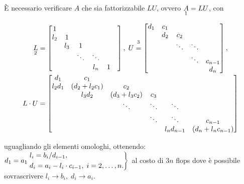 \noindent È necessario verificare $A$ che sia fattorizzabile $LU$, ovvero $\underset{\footnotemark}{A}=LU$, con
\begin{equation*}
    \begin{matrix}
        \underset{\footnotemark}{L}=
    \begin{bmatrix}
        1 & & & &\\
        l_2 & 1 & & &\\
        & l_3 & 1 & &\\
        & & \ddots & \ddots & &\\
        & & & l_n & 1
    \end{bmatrix}
    ,\; U\overset{\footnotemark}{=}
    \begin{bmatrix}
        d_1 & c_1 &\\
            & d_2 & c_2\\
            & & \ddots & \ddots\\
            & & & \ddots & c_{n-1}\\
            & & & & d_n
    \end{bmatrix},\\
    L\cdot U=
    \begin{bmatrix}
        d_1 & c_1 & & & &\\
        l_2d_1 & (d_2+l_2 c_1) & c_2 & & &\\
            & l_3d_2 & (d_3+l_3c_2) & c_3 & &\\
            & & \ddots &\ddots & \ddots &\\
            & & & \ddots & \ddots & c_{n-1}\\
            & & & &  l_nd_{n-1} & (d_n+l_nc_{n-1})
    \end{bmatrix}
    \end{matrix}
\end{equation*}
\addtocounter{footnote}{-1}


\noindent uguagliando gli elementi omologhi, ottenendo:\\
$d_1=a_1\\
\begin{rcases}
l_i=b_i/d_{i-1},\\
d_i=a_i-l_i\cdot c_{i-1},\; i=2,\hdots, n.
\end{rcases}$
al costo di $3n$ flops dove è possibile sovrascrivere $l_i\rightarrow b_i,\; d_i\rightarrow a_i$.

